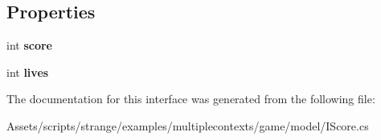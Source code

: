 \subsection*{Properties}
\begin{DoxyCompactItemize}
\item 
\hypertarget{interfacestrange_1_1examples_1_1multiplecontexts_1_1game_1_1_i_score_a6548d079522416addd299596b026f5fc}{int {\bfseries score}}\label{interfacestrange_1_1examples_1_1multiplecontexts_1_1game_1_1_i_score_a6548d079522416addd299596b026f5fc}

\item 
\hypertarget{interfacestrange_1_1examples_1_1multiplecontexts_1_1game_1_1_i_score_ab0cdb35616e147587757fe47afb46a99}{int {\bfseries lives}}\label{interfacestrange_1_1examples_1_1multiplecontexts_1_1game_1_1_i_score_ab0cdb35616e147587757fe47afb46a99}

\end{DoxyCompactItemize}


The documentation for this interface was generated from the following file\-:\begin{DoxyCompactItemize}
\item 
Assets/scripts/strange/examples/multiplecontexts/game/model/I\-Score.\-cs\end{DoxyCompactItemize}
